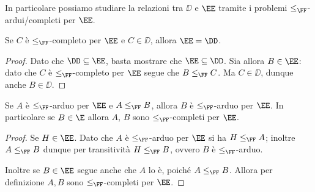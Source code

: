 In particolare possiamo studiare la relazioni tra $\DD$ e $\EE$ tramite i problemi $\leq_{\FF}$-ardui/completi per $\EE$.

\begin{proposition}
    Se $C$ è $\leq_{\FF}$-completo per $\EE$ e $C \in \DD$, allora $\EE = \DD$.    
\end{proposition}
\begin{proof}
    Dato che $\DD \subseteq \EE$, basta mostrare che $\EE \subseteq \DD$. Sia allora $B \in \EE$: dato che $C$ è $\leq_{\FF}$-completo per $\EE$ segue che $B \leq_{\FF} C$. Ma $C \in \DD$, dunque anche $B \in \DD$.      
\end{proof}

\begin{proposition}[][A-hard=>B-hard]
    Se $A$ è $\leq_{\FF}$-arduo per $\EE$ e $A \leq_{\FF} B$, allora $B$ è $\leq_{\FF}$-arduo per $\EE$. In particolare se $B \in \E$ allora $A$, $B$ sono $\leq_{\FF}$-completi per $\EE$.          
\end{proposition}
\begin{proof}
    Se $H \in \EE$. Dato che $A$ è $\leq_{\FF}$-arduo per $\EE$ si ha $H \leq_{\FF} A$; inoltre $A \leq_{\FF} B$ dunque per transitività $H \leq_{\FF} B$, ovvero $B$ è $\leq_{\FF}$-arduo.
    
    Inoltre se $B \in \EE$ segue anche che $A$ lo è, poiché $A \leq_{\FF} B$. Allora per definizione $A, B$ sono $\leq_{\FF}$-completi per $\EE$.
\end{proof}